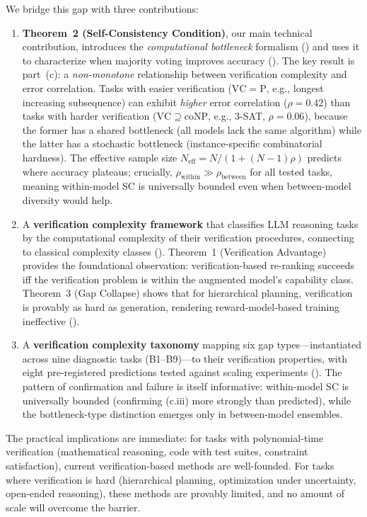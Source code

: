 \documentclass{article}
\theoremstyle{definition}
\theoremstyle{remark}
\newcommand{\PTIME}{\mathrm{P}}
\newcommand{\coNP}{\mathrm{coNP}}
\newcommand{\VC}{\mathrm{VC}}           %
\begin{document}
We bridge this gap with three contributions:
\begin{enumerate}[leftmargin=*,itemsep=2pt]
    \item \textbf{Theorem~2 (Self-Consistency Condition)}, our main technical contribution, introduces the \emph{computational bottleneck} formalism () and uses it to characterize when majority voting improves accuracy ().
    The key result is part~(c): a \emph{non-monotone} relationship between verification complexity and error correlation.
    Tasks with easier verification ($\VC = \PTIME$, e.g., longest increasing subsequence) can exhibit \emph{higher} error correlation ($\rho = 0.42$) than tasks with harder verification ($\VC \supseteq \coNP$, e.g., 3-SAT, $\rho = 0.06$), because the former has a shared bottleneck (all models lack the same algorithm) while the latter has a stochastic bottleneck (instance-specific combinatorial hardness).
    The effective sample size $N_{\text{eff}} = N/(1 + (N-1)\rho)$ predicts where accuracy plateaus; crucially, $\rho_{\text{within}} \gg \rho_{\text{between}}$ for all tested tasks, meaning within-model SC is universally bounded even when between-model diversity would help.
    \item A \textbf{verification complexity framework} that classifies LLM reasoning tasks by the computational complexity of their verification procedures, connecting to classical complexity classes ().
    Theorem~1 (Verification Advantage) provides the foundational observation: verification-based re-ranking succeeds iff the verification problem is within the augmented model's capability class.
    Theorem~3 (Gap Collapse) shows that for hierarchical planning, verification is provably as hard as generation, rendering reward-model-based training ineffective ().
    \item A \textbf{verification complexity taxonomy} mapping six gap types---instantiated across nine diagnostic tasks (B1--B9)---to their verification properties, with eight pre-registered predictions tested against scaling experiments ().
    The pattern of confirmation and failure is itself informative: within-model SC is universally bounded (confirming (c.iii) more strongly than predicted), while the bottleneck-type distinction emerges only in between-model ensembles.
\end{enumerate}

The practical implications are immediate: for tasks with polynomial-time verification (mathematical reasoning, code with test suites, constraint satisfaction), current verification-based methods are well-founded.
For tasks where verification is hard (hierarchical planning, optimization under uncertainty, open-ended reasoning), these methods are provably limited, and no amount of scale will overcome the barrier.
\end{document}
